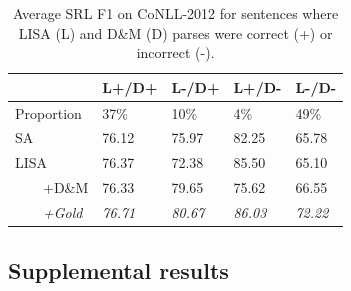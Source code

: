\documentclass[11pt,a4paper]{article}
\begin{document}


\begin{table}
\begin{tabular}{lllll}
& L+/D+ & L-/D+ & L+/D- & L-/D- \\ \hline \hline
Proportion & 37\% &	10\% &	4\% &	49\% \\ \hline
SA & 76.12 & 75.97 & 82.25 &	65.78 \\ 
LISA & 76.37 &	72.38 &	85.50 &	65.10 \\
\ \ \ \ +D\&M & 76.33	& 79.65 &	75.62 &	66.55 \\
\ \ \ \ \emph{+Gold} & \emph{76.71} & \emph{80.67} & \emph{86.03} & \emph{72.22} \\
\end{tabular}
\caption{Average SRL F1 on CoNLL-2012 for sentences where LISA (L) and D\&M (D) parses were correct (+) or incorrect (-). \label{tab:app:parse-srl-by-sents}}
\end{table}

\subsection{Supplemental results}
\end{document}
